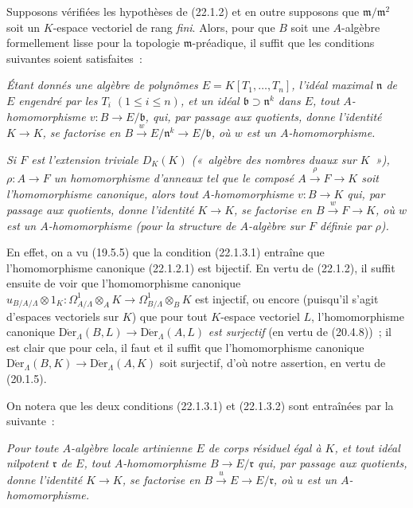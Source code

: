 \begin{remark}[22.1.3]
\label{0.22.1.3-fr}
Supposons vérifiées les hypothèses de (22.1.2) et en outre supposons que
$\mathfrak m/\mathfrak m^2$ soit un $K$-espace vectoriel de rang \emph{fini}.
Alors, pour que $B$ soit une $A$-algèbre formellement lisse pour la topologie
$\mathfrak m$-préadique, il suffit que les conditions suivantes soient
satisfaites~:

\begin{env}[22.1.3.1]
\label{0.22.1.3.1-fr}
\itshape Étant donnés une algèbre de polynômes $E=K[T_1,\ldots,T_n]$, l'idéal maximal
$\mathfrak n$ de $E$ engendré par les $T_i$ $(1\leqslant i\leqslant n)$, et
un idéal $\mathfrak b\supset\mathfrak n^k$ dans $E$, tout
$A$-homomorphisme $v:B\to E/\mathfrak b$, qui, par passage aux
quotients, donne l'identité $K\to K$, se factorise en
$B\xrightarrow{w}E/\mathfrak n^k\to E/\mathfrak b$,
où $w$ est un $A$-homomorphisme.
\end{env}

\begin{env}[22.1.3.2]
\label{0.22.1.3.2-fr}
\itshape Si $F$ est l'extension triviale $D_K(K)$ \textup{(«~algèbre des nombres duaux sur
$K$~»)}, $\rho:A\to F$ un homomorphisme d'anneaux tel que le composé
$A\xrightarrow{\rho}F\to K$ soit l'homomorphisme canonique, alors tout
$A$-homomorphisme $v:B\to K$ qui, par passage aux quotients, donne
l'identité $K\to K$, se factorise en
$B\xrightarrow{w}F\to K$,
où $w$ est un $A$-homomorphisme (pour la structure de $A$-algèbre sur
$F$ définie par $\rho$).
\end{env}

En effet, on a vu (19.5.5) que la condition (22.1.3.1) entraîne que
l'homomorphisme canonique (22.1.2.1) est bijectif. En vertu de (22.1.2), il
suffit ensuite de voir que l'homomorphisme canonique
$u_{B/A/\Lambda}\otimes1_K:\Omega^1_{A/\Lambda}\otimes_AK\to\Omega^1_{B/\Lambda}\otimes_BK$
est injectif, ou encore (puisqu'il s'agit d'espaces vectoriels sur $K$) que
pour tout $K$-espace vectoriel $L$, l'homomorphisme canonique
$\operatorname{D\acute{e}r}_\Lambda(B,L)\to\operatorname{D\acute{e}r}_\Lambda(A,L)$ \emph{est
surjectif} (en vertu de (20.4.8))~; il est clair que pour cela, il faut
et il suffit que l'homomorphisme canonique
$\operatorname{D\acute{e}r}_\Lambda(B,K)\to\operatorname{D\acute{e}r}_\Lambda(A,K)$ soit
surjectif, d'où notre assertion, en vertu de (20.1.5).

On notera que les deux conditions (22.1.3.1) et (22.1.3.2) sont entraînées
par la suivante~:

\begin{env}[22.1.3.3]
\label{0.22.1.3.3-fr}
\itshape Pour toute $A$-algèbre locale \textup{artinienne} $E$ de corps résiduel \textup{égal à}
$K$, et tout idéal nilpotent $\mathfrak r$ de $E$, tout
$A$-homomorphisme $B\to E/\mathfrak r$ qui, par passage aux quotients,
donne l'identité $K\to K$, se factorise en
$B\xrightarrow{u}E\to E/\mathfrak r$, où $u$ est un
$A$-homomorphisme.
\end{env}
\end{remark}

